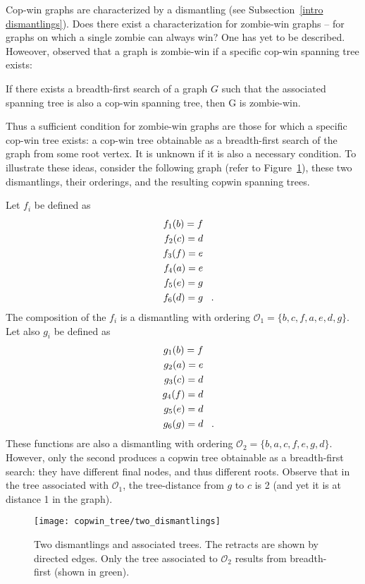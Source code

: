 Cop-win graphs are characterized by a dismantling (see Subsection~\ref{intro dismantlings}). Does there exist a characterization for zombie-win graphs -- for graphs on which a single zombie can always win? One has yet to be described. Howeover, \cite{fitzpatrick2016deterministic} observed that a graph is zombie-win if a specific cop-win spanning tree exists:

\begin{theorem} If there exists a breadth-first search of a graph $G$ such that the associated spanning tree is also a cop-win spanning tree, then G is zombie-win. \label{thm:zombie_tree}
\end{theorem}

Thus a sufficient condition for zombie-win graphs are those for which a specific cop-win tree exists: a cop-win tree obtainable as a breadth-first search of the graph from some root vertex. It is unknown if it is also a necessary condition. To illustrate these ideas, consider the following graph (refer to Figure~\ref{fig:two_dismantlings}), these two dismantlings, their orderings, and the resulting copwin spanning trees.

Let $f_i$ be defined as
\begin{align*}
  f_1(b) = f \\
  f_2(c) = d \\
  f_3(f) = e \\
  f_4(a) = e \\
  f_5(e) = g \\
  f_6(d) = g \mperiod
\end{align*}
The composition of the $f_i$ is a dismantling with ordering $\mathcal{O}_1 = \{ b, c, f, a, e, d, g \}$.
Let also $g_i$ be defined as
\begin{align*}
  g_1(b) = f \\
  g_2(a) = e \\
  g_3(c) = d \\
  g_4(f) = d \\
  g_5(e) = d \\
  g_6(g) = d \mperiod
\end{align*}
These functions are also a dismantling with ordering $\mathcal{O}_2 = \{b, a, c, f, e, g, d \}$.
However, only the second produces a copwin tree obtainable as a breadth-first search: they have different final nodes, and thus different roots. Observe that in the tree associated with $\mathcal{O}_1$, the tree-distance from $g$ to $c$ is 2 (and yet it is at distance 1 in the graph).

\begin{figure}
\centering
\texttt{[image: copwin\_tree/two\_dismantlings]}
\caption{Two dismantlings and associated trees. The retracts are shown by directed edges. Only the tree associated to $\mathcal{O}_2$ results from breadth-first (shown in green). \label{fig:two_dismantlings}}
\end{figure}

